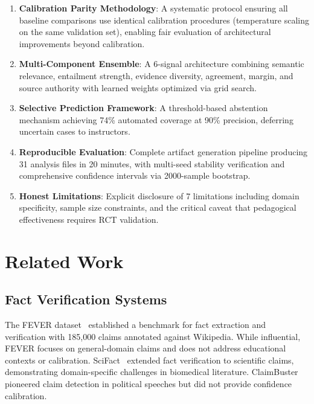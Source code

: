 \documentclass[journal]{IEEEtran}
\begin{document}
\begin{enumerate}
    \item \textbf{Calibration Parity Methodology}: A systematic protocol ensuring all baseline comparisons use identical calibration procedures (temperature scaling on the same validation set), enabling fair evaluation of architectural improvements beyond calibration.

    \item \textbf{Multi-Component Ensemble}: A 6-signal architecture combining semantic relevance, entailment strength, evidence diversity, agreement, margin, and source authority with learned weights optimized via grid search.

    \item \textbf{Selective Prediction Framework}: A threshold-based abstention mechanism achieving 74\% automated coverage at 90\% precision, deferring uncertain cases to instructors.

    \item \textbf{Reproducible Evaluation}: Complete artifact generation pipeline producing 31 analysis files in 20 minutes, with multi-seed stability verification and comprehensive confidence intervals via 2000-sample bootstrap.

    \item \textbf{Honest Limitations}: Explicit disclosure of 7 limitations including domain specificity, sample size constraints, and the critical caveat that pedagogical effectiveness requires RCT validation.
\end{enumerate}


\section{Related Work}

\subsection{Fact Verification Systems}

The FEVER dataset~\cite{FEVER2018} established a benchmark for fact extraction and verification with 185,000 claims annotated against Wikipedia. While influential, FEVER focuses on general-domain claims and does not address educational contexts or calibration. SciFact~\cite{SciFact2020} extended fact verification to scientific claims, demonstrating domain-specific challenges in biomedical literature. ClaimBuster~\cite{ClaimBuster2017} pioneered claim detection in political speeches but did not provide confidence calibration.
\end{document}
